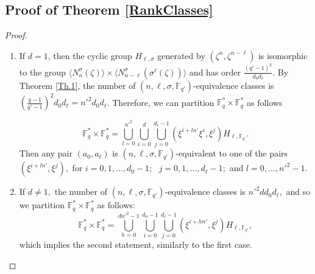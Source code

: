 \documentclass[12pt,paper]{article}
\theoremstyle{plain}
\newcommand{\Fq}{\mathbb{F}_{q}}
\begin{document}
 

\subsection{Proof of Theorem  \ref{RankClasses}}
\begin{proof}\;
\begin{enumerate}
    \item  If $ d = 1 $, then the cyclic group $ H_{\ell,\sigma} $ generated by $ \left( \zeta^n, \zeta^{n-\ell}\right) $ is isomorphic to the group $ \langle  N_n^{\sigma}(\zeta) \rangle \times \langle N_{n-\ell}^{\sigma}(\sigma^{\ell}(\zeta))  \rangle $ and has order $ \frac{(q'-1)^2}{d_0 d_{\ell}} $. By Theorem \ref{Th.1}, the number of $ (n,\ell,\sigma, \mathbb{F}_{q'})$-equivalence classes is $ \left(\frac{q-1}{q'-1}\right)^2 d_0 d_{\ell}= n'^2 d_0 d_{\ell} $. 
    Therefore, we can partition $ \Fq^* \times \Fq^* $ as follows

$$
\Fq^* \times \Fq^* = \bigcup_{l =0}^{n'^2} \bigcup_{i=0}^{d} \bigcup_{j=0}^{d_{\ell}-1} ( \xi^{i+ln'}\xi^i, \xi^j ) H_{\ell, \mathbb{F}_{q'} }.
$$
Then any pair $(a_0,a_{\ell})$ is $( n,\ell,\sigma, \mathbb{F}_{q'})$-equivalent to one of the pairs   $ ( \xi^{i+ln' },  \xi^{j } ) , $ for  $i=0,1,\ldots, d_0-1$; \   $j=0,1,\ldots, d_{\ell}-1;  $ and $ l=0,\ldots, n'^2-1.$
 \item 
 If $d\neq 1, $ the number of  $(n,\ell,\sigma, \mathbb{F}_{q'})$-equivalence classes is $ n'^2 d d_0 d_{\ell} ,$ and so we partition $ \Fq^* \times \Fq^* $ as follows:
$$  \Fq^{*}\times \Fq^{*} = 
\bigcup_{h=0}^{d n'^2 -1}  \bigcup_{i=0}^{d_0-1} \bigcup_{j=0}^{d_{\ell}-1} (\xi^{i +hn'} ,\xi^{j}) H_{\ell,\mathbb{F}_{q'}}, $$
which implies the second statement, similarly to the first case.
\end{enumerate}
\end{proof}\;
\end{document}
